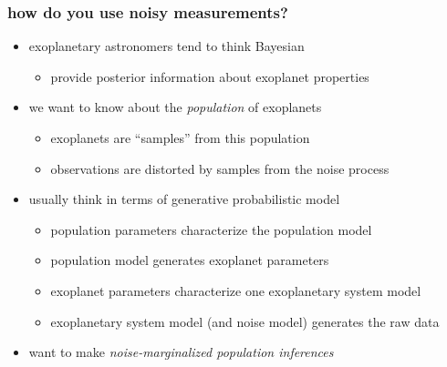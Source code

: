 \documentclass[pdftex]{beamer}
\begin{document}
\begin{frame}
  \frametitle{how do you use noisy measurements?}
  \begin{itemize}
  \item exoplanetary astronomers tend to think Bayesian
    \begin{itemize}
    \item provide posterior information about exoplanet properties
    \end{itemize}
  \item we want to know about the \emph{population} of exoplanets
    \begin{itemize}
    \item exoplanets are ``samples'' from this population
    \item observations are distorted by samples from the noise process
    \end{itemize}
  \item usually think in terms of generative probabilistic model
    \begin{itemize}
    \item population parameters characterize the population model
    \item population model generates exoplanet parameters
    \item exoplanet parameters characterize one exoplanetary system model
    \item exoplanetary system model (and noise model) generates the raw data
    \end{itemize}
  \item want to make \emph{noise-marginalized population inferences}
  \end{itemize}
\end{frame}
\end{document}
